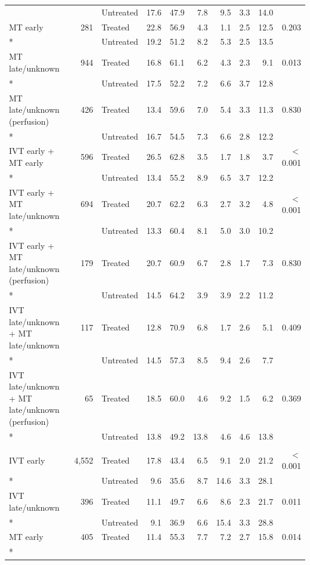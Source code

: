 \begin{landscape}
\begin{longtable}{p{5.6cm}rlrrrrrrr}
 & & Untreated & 17.6 & 47.9 & 7.8 & 9.5 & 3.3 & 14.0 & \\[2pt]
MT early & 281 & Treated & 22.8 & 56.9 & 4.3 & 1.1 & 2.5 & 12.5 & 0.203 \\*
 & & Untreated & 19.2 & 51.2 & 8.2 & 5.3 & 2.5 & 13.5 & \\[2pt]
MT late/unknown & 944 & Treated & 16.8 & 61.1 & 6.2 & 4.3 & 2.3 & 9.1 & 0.013 \\*
 & & Untreated & 17.5 & 52.2 & 7.2 & 6.6 & 3.7 & 12.8 & \\[2pt]
MT late/unknown (perfusion) & 426 & Treated & 13.4 & 59.6 & 7.0 & 5.4 & 3.3 & 11.3 & 0.830 \\*
 & & Untreated & 16.7 & 54.5 & 7.3 & 6.6 & 2.8 & 12.2 & \\[2pt]
IVT early + MT early & 596 & Treated & 26.5 & 62.8 & 3.5 & 1.7 & 1.8 & 3.7 & $<$0.001 \\*
 & & Untreated & 13.4 & 55.2 & 8.9 & 6.5 & 3.7 & 12.2 & \\[2pt]
IVT early + MT late/unknown & 694 & Treated & 20.7 & 62.2 & 6.3 & 2.7 & 3.2 & 4.8 & $<$0.001 \\*
 & & Untreated & 13.3 & 60.4 & 8.1 & 5.0 & 3.0 & 10.2 & \\[2pt]
IVT early + MT late/unknown (perfusion) & 179 & Treated & 20.7 & 60.9 & 6.7 & 2.8 & 1.7 & 7.3 & 0.830 \\*
 & & Untreated & 14.5 & 64.2 & 3.9 & 3.9 & 2.2 & 11.2 & \\[2pt]
IVT late/unknown + MT late/unknown & 117 & Treated & 12.8 & 70.9 & 6.8 & 1.7 & 2.6 & 5.1 & 0.409 \\*
 & & Untreated & 14.5 & 57.3 & 8.5 & 9.4 & 2.6 & 7.7 & \\[2pt]
IVT late/unknown + MT late/unknown (perfusion) & 65 & Treated & 18.5 & 60.0 & 4.6 & 9.2 & 1.5 & 6.2 & 0.369 \\*
 & & Untreated & 13.8 & 49.2 & 13.8 & 4.6 & 4.6 & 13.8 & \\[2pt]
\addlinespace
\multicolumn{10}{l}{\textbf{NIHSS 16--20}}\\
IVT early & 4,552 & Treated & 17.8 & 43.4 & 6.5 & 9.1 & 2.0 & 21.2 & $<$0.001 \\*
 & & Untreated & 9.6 & 35.6 & 8.7 & 14.6 & 3.3 & 28.1 & \\[2pt]
IVT late/unknown & 396 & Treated & 11.1 & 49.7 & 6.6 & 8.6 & 2.3 & 21.7 & 0.011 \\*
 & & Untreated & 9.1 & 36.9 & 6.6 & 15.4 & 3.3 & 28.8 & \\[2pt]
MT early & 405 & Treated & 11.4 & 55.3 & 7.7 & 7.2 & 2.7 & 15.8 & 0.014 \\*

\end{longtable}
\end{landscape}
